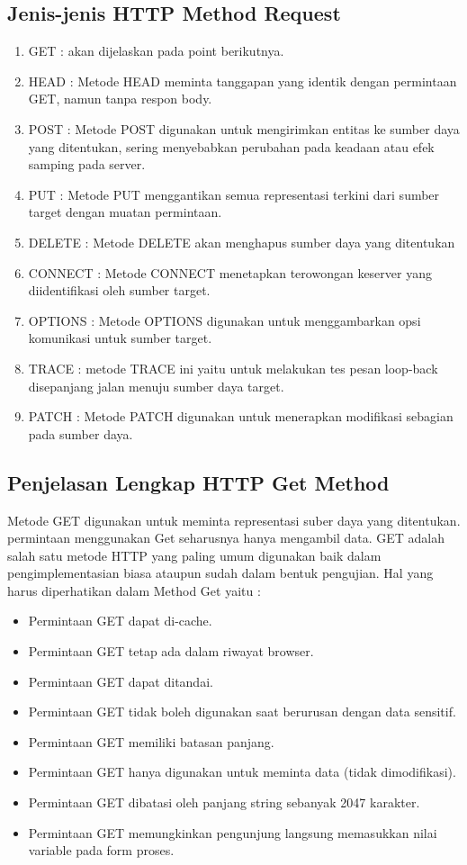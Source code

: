 \subsection{Jenis-jenis HTTP Method Request}
\begin{enumerate}
  \item GET : akan dijelaskan pada point berikutnya.
  \item HEAD : Metode HEAD meminta tanggapan yang identik dengan permintaan GET, namun tanpa respon body.
  \item POST : Metode POST digunakan untuk mengirimkan entitas ke sumber daya yang ditentukan, sering menyebabkan perubahan pada keadaan atau efek samping pada server.
  \item PUT : Metode PUT menggantikan semua representasi terkini dari sumber target dengan muatan permintaan.
  \item DELETE : Metode DELETE akan menghapus sumber daya yang ditentukan
  \item CONNECT : Metode CONNECT menetapkan terowongan keserver yang diidentifikasi oleh sumber target.
  \item OPTIONS : Metode OPTIONS digunakan untuk menggambarkan opsi komunikasi untuk sumber target.
  \item TRACE : metode TRACE ini yaitu untuk melakukan tes pesan loop-back disepanjang jalan menuju sumber daya target.
  \item PATCH : Metode PATCH digunakan untuk menerapkan modifikasi sebagian pada sumber daya.
\end{enumerate}

\subsection{Penjelasan Lengkap HTTP Get Method}
Metode GET digunakan untuk meminta representasi suber daya yang ditentukan. permintaan menggunakan Get seharusnya hanya mengambil data. GET adalah salah satu metode HTTP yang paling umum digunakan baik dalam pengimplementasian biasa ataupun sudah dalam bentuk pengujian. Hal yang harus diperhatikan dalam Method Get yaitu :
\begin{itemize}
  \item Permintaan GET dapat di-cache.
  \item Permintaan GET tetap ada dalam riwayat browser.
  \item Permintaan GET dapat ditandai.
  \item Permintaan GET tidak boleh digunakan saat berurusan dengan data sensitif.
  \item Permintaan GET memiliki batasan panjang.
  \item Permintaan GET hanya digunakan untuk meminta data (tidak dimodifikasi).
  \item Permintaan GET dibatasi oleh panjang string sebanyak 2047 karakter.
  \item Permintaan GET memungkinkan pengunjung langsung memasukkan nilai variable pada form proses.
\end{itemize}

